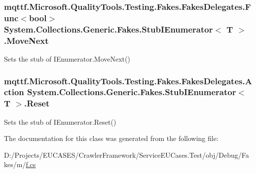 \hypertarget{class_system_1_1_collections_1_1_generic_1_1_fakes_1_1_stub_i_enumerator_3_01_t_01_4_a00066e3dcb0bd7faac252241df8a500a}{
\subsubsection[{Move\-Next}]{\setlength{\rightskip}{0pt plus 5cm}mqttf.\-Microsoft.\-Quality\-Tools.\-Testing.\-Fakes.\-Fakes\-Delegates.\-Func$<$bool$>$ System.\-Collections.\-Generic.\-Fakes.\-Stub\-I\-Enumerator$<$ T $>$.Move\-Next}}\label{class_system_1_1_collections_1_1_generic_1_1_fakes_1_1_stub_i_enumerator_3_01_t_01_4_a00066e3dcb0bd7faac252241df8a500a}


Sets the stub of I\-Enumerator.\-Move\-Next()

\hypertarget{class_system_1_1_collections_1_1_generic_1_1_fakes_1_1_stub_i_enumerator_3_01_t_01_4_aedba7201d29a9d984e781fe29daafaed}{
\subsubsection[{Reset}]{\setlength{\rightskip}{0pt plus 5cm}mqttf.\-Microsoft.\-Quality\-Tools.\-Testing.\-Fakes.\-Fakes\-Delegates.\-Action System.\-Collections.\-Generic.\-Fakes.\-Stub\-I\-Enumerator$<$ T $>$.Reset}}\label{class_system_1_1_collections_1_1_generic_1_1_fakes_1_1_stub_i_enumerator_3_01_t_01_4_aedba7201d29a9d984e781fe29daafaed}


Sets the stub of I\-Enumerator.\-Reset()



The documentation for this class was generated from the following file\-:\begin{DoxyCompactItemize}
\item 
D\-:/\-Projects/\-E\-U\-C\-A\-S\-E\-S/\-Crawler\-Framework/\-Service\-E\-U\-Cases.\-Test/obj/\-Debug/\-Fakes/m/\hyperlink{m_2f_8cs}{f.\-cs}\end{DoxyCompactItemize}

